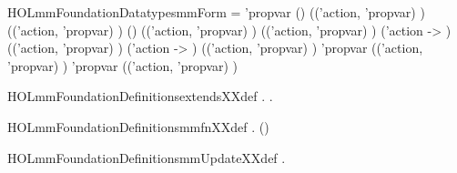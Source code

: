 \newcommand{\HOLmmFoundationDate}{19 August 2017}
\newcommand{\HOLmmFoundationTime}{09:53}
\begin{SaveVerbatim}{HOLmmFoundationDatatypesmmForm}
 =
  \HOLTokenBar{} 
  \HOLTokenBar{}  'propvar
  \HOLTokenBar{} () (('action, 'propvar) )
            (('action, 'propvar) )
  \HOLTokenBar{} () (('action, 'propvar) )
           (('action, 'propvar) )
  \HOLTokenBar{}  ('action -> ) (('action, 'propvar) )
  \HOLTokenBar{}  ('action -> ) (('action, 'propvar) )
  \HOLTokenBar{}  'propvar (('action, 'propvar) )
  \HOLTokenBar{}  'propvar (('action, 'propvar) )
\end{SaveVerbatim}
\newcommand{\HOLmmFoundationDatatypesmmForm}{\UseVerbatim{HOLmmFoundationDatatypesmmForm}}
\newcommand{\HOLmmFoundationDatatypes}{
\HOLmmFoundationDatatypesmmForm}
\begin{SaveVerbatim}{HOLmmFoundationDefinitionsextendsXXdef}
\HOLTokenTurnstile{} \HOLSymConst{\HOLTokenForall{}} .    \HOLSymConst{\HOLTokenEquiv{}} \HOLSymConst{\HOLTokenForall{}}.   \HOLConst{\HOLTokenSubset{}}  
\end{SaveVerbatim}
\newcommand{\HOLmmFoundationDefinitionsextendsXXdef}{\UseVerbatim{HOLmmFoundationDefinitionsextendsXXdef}}
\begin{SaveVerbatim}{HOLmmFoundationDefinitionsmmfnXXdef}
\HOLTokenTurnstile{} \HOLSymConst{\HOLTokenForall{}}   .
          \HOLSymConst{=} \HOLTokenLeftbrace{} \HOLTokenBar{}  \HOLConst{\HOLTokenIn{}}  \HOLSymConst{\HOLTokenConj{}} (\HOLSymConst{,}\HOLSymConst{,})  \HOLTokenRightbrace{}
\end{SaveVerbatim}
\newcommand{\HOLmmFoundationDefinitionsmmfnXXdef}{\UseVerbatim{HOLmmFoundationDefinitionsmmfnXXdef}}
\begin{SaveVerbatim}{HOLmmFoundationDefinitionsmmUpdateXXdef}
\HOLTokenTurnstile{} \HOLSymConst{\HOLTokenForall{}}   .      \HOLSymConst{=}   \HOLSymConst{=}      
\end{SaveVerbatim}
